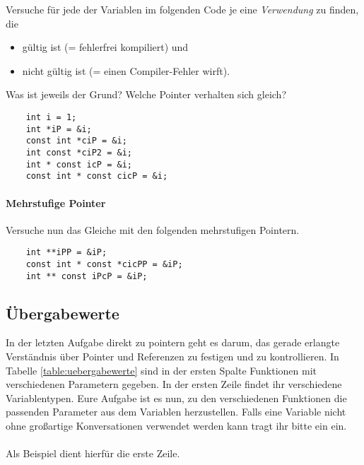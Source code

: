 Versuche für jede der Variablen im folgenden Code je eine \emph{Verwendung} zu finden, die  
\begin{itemize}
\item gültig ist (= fehlerfrei kompiliert) und
\item nicht gültig ist (= einen Compiler-Fehler wirft).
\end{itemize}


Was ist jeweils der Grund?
Welche Pointer verhalten sich gleich?

\begin{lstlisting}
    int i = 1;    
    int *iP = &i;
    const int *ciP = &i;
    int const *ciP2 = &i;
    int * const icP = &i;    
    const int * const cicP = &i;
\end{lstlisting}

\paragraph{Mehrstufige Pointer}

Versuche nun das Gleiche mit den folgenden mehrstufigen Pointern.

\begin{lstlisting}
    int **iPP = &iP;
    const int * const *cicPP = &iP;
    int ** const iPcP = &iP;
\end{lstlisting}



\subsection{Übergabewerte}
In der letzten Aufgabe direkt zu pointern geht es darum, das gerade erlangte Verständnis über Pointer und Referenzen zu festigen und zu kontrollieren.
In Tabelle \ref{table:uebergabewerte} sind in der ersten Spalte Funktionen mit verschiedenen Parametern gegeben.
In der ersten Zeile findet ihr verschiedene Variablentypen.
Eure Aufgabe ist es nun, zu den verschiedenen Funktionen die passenden Parameter aus dem Variablen herzustellen.
Falls eine Variable nicht ohne großartige Konversationen verwendet werden kann tragt ihr bitte ein \xmark ein. \\\\
Als Beispiel dient hierfür die erste Zeile. 

